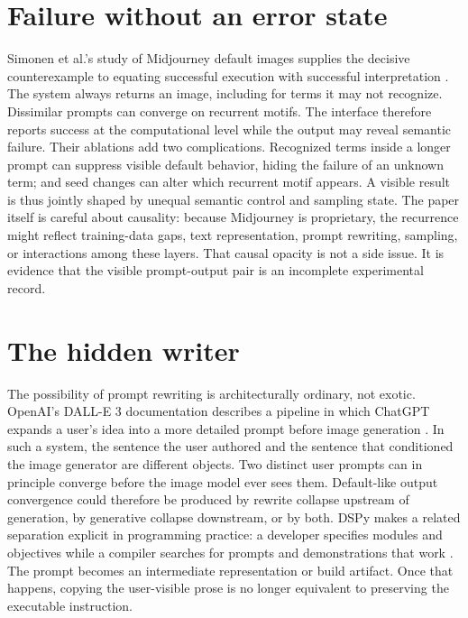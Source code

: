 \documentclass[11pt]{article}
\begin{document}
\section{Failure without an error state}
Simonen et al.'s study of Midjourney default images supplies the decisive counterexample to equating successful execution with successful interpretation \citep{Simonen2026DefaultImages}. The system always returns an image, including for terms it may not recognize. Dissimilar prompts can converge on recurrent motifs. The interface therefore reports success at the computational level while the output may reveal semantic failure. Their ablations add two complications. Recognized terms inside a longer prompt can suppress visible default behavior, hiding the failure of an unknown term; and seed changes can alter which recurrent motif appears. A visible result is thus jointly shaped by unequal semantic control and sampling state. The paper itself is careful about causality: because Midjourney is proprietary, the recurrence might reflect training-data gaps, text representation, prompt rewriting, sampling, or interactions among these layers. That causal opacity is not a side issue. It is evidence that the visible prompt-output pair is an incomplete experimental record.
\section{The hidden writer}
The possibility of prompt rewriting is architecturally ordinary, not exotic. OpenAI's DALL-E 3 documentation describes a pipeline in which ChatGPT expands a user's idea into a more detailed prompt before image generation \citep{OpenAI2023DALLE3}. In such a system, the sentence the user authored and the sentence that conditioned the image generator are different objects. Two distinct user prompts can in principle converge before the image model ever sees them. Default-like output convergence could therefore be produced by rewrite collapse upstream of generation, by generative collapse downstream, or by both. DSPy makes a related separation explicit in programming practice: a developer specifies modules and objectives while a compiler searches for prompts and demonstrations that work \citep{Khattab2023DSPy}. The prompt becomes an intermediate representation or build artifact. Once that happens, copying the user-visible prose is no longer equivalent to preserving the executable instruction.
\end{document}
